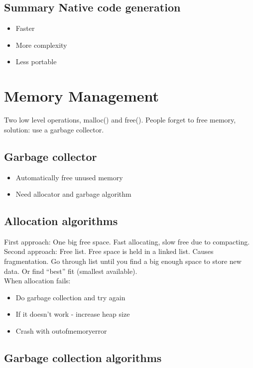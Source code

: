 \documentclass[a4paper]{article}
\begin{document}
\subsection{Summary Native code generation}
\begin{itemize}
    \item Faster
    \item More complexity
    \item Less portable
\end{itemize}
\section{Memory Management}
Two low level operations, malloc() and free(). People forget to free memory,
solution: use a garbage collector.
\subsection{Garbage collector}
\begin{itemize}
    \item Automatically free unused memory
    \item Need allocator and garbage algorithm
\end{itemize}
\subsection{Allocation algorithms}
First approach: One big free space. Fast allocating, slow free due to compacting.
\\Second approach: Free list. Free space is held in a linked list. 
Causes fragmentation. Go through list until you find a big enough space to store new data.
Or find ``best'' fit (smallest available).
\\
When allocation fails:
\begin{itemize}
    \item Do garbage collection and try again
    \item If it doesn't work - increase heap size
    \item Crash with outofmemoryerror
\end{itemize}
\subsection{Garbage collection algorithms}
\end{document}

